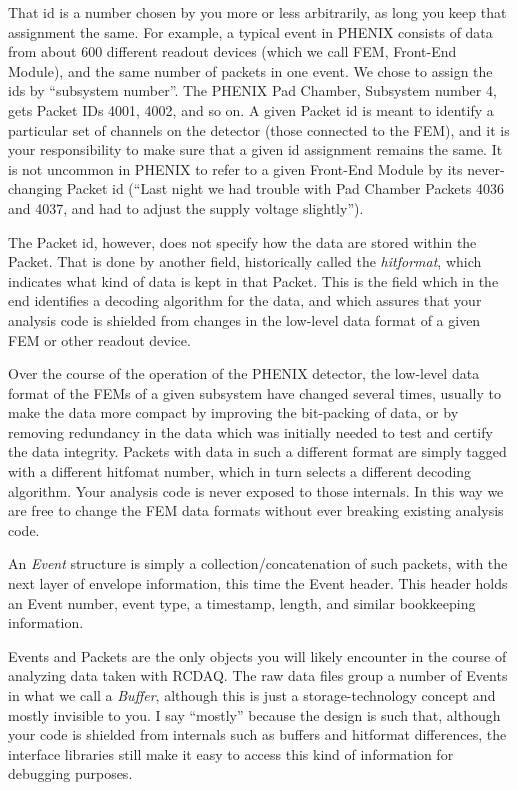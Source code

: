 \documentclass{article}[11pt]
\begin{document}
That id is a number chosen by you more or less arbitrarily, as long 
you keep that assignment the same. For example, a typical event in
PHENIX consists of data from about 600 different readout devices
(which we call FEM, Front-End Module), and the same number of packets
in one event. We chose to assign the ids by ``subsystem number''.  The
PHENIX Pad Chamber, Subsystem number 4, gets Packet IDs 4001, 4002,
and so on. A given Packet id is meant to identify a particular set of
channels on the detector (those connected to the FEM), and it is your
responsibility to make sure that a given id assignment remains the
same. It is not uncommon in PHENIX to refer to a given Front-End
Module by its never-changing Packet id (``Last night we had trouble
with Pad Chamber Packets 4036 and 4037, and had to adjust the supply
voltage slightly'').

The Packet id, however, does not specify how the data are stored
within the Packet. That is done by another field, historically called
the \emph{hitformat}, which indicates what kind of data is kept in
that Packet. This is the field which in the end identifies a decoding
algorithm for the data, and which assures that your analysis code is
shielded from changes in the low-level data format of a given FEM or other
readout device. 

Over the course of the operation of the PHENIX detector, the low-level
data format of the FEMs of a given subsystem have changed several
times, usually to make the data more compact by improving the
bit-packing of data, or by removing redundancy in the data which was
initially needed to test and certify the data integrity. Packets with
data in such a different format are simply tagged with a different
hitfomat number, which in turn selects a different decoding
algorithm. Your analysis code is never exposed to those internals. In
this way we are free to change the FEM data formats without ever
breaking existing analysis code.

An \emph{Event} structure is simply a collection/concatenation of such
packets, with the next layer of envelope information, this time the
Event header. This header holds an Event number, event type, a timestamp,
length, and similar bookkeeping information.

Events and Packets are the only objects you will likely encounter in
the course of analyzing data taken with RCDAQ. The raw data files
group a number of Events in what we call a \emph{Buffer}, although
this is just a storage-technology concept and mostly invisible to
you. I say ``mostly'' because the design is such that, although your
code is shielded from internals such as buffers and hitformat
differences, the interface libraries still make it easy to access this
kind of information for debugging purposes.
\end{document}
